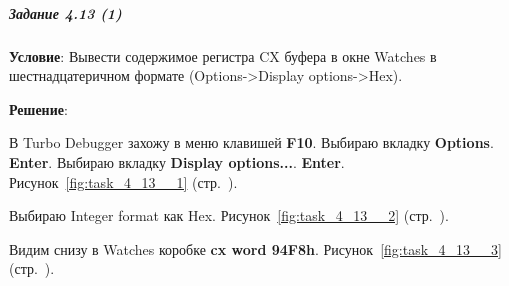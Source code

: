 \subparagraph{Задание 4.13 (1)}

\textbf{Условие}: Вывести содержимое регистра CX буфера в окне Watches в шестнадцатеричном формате (Options->Display options->Hex).

\textbf{Решение}:

В Turbo Debugger захожу в меню клавишей \textbf{F10}. Выбираю вкладку \textbf{Options}. \textbf{Enter}. Выбираю вкладку \textbf{Display options...}. \textbf{Enter}.
Рисунок~\ref{fig:task_4_13__1} (стр.~\pageref{fig:task_4_13__1}).

Выбираю Integer format как Hex.
Рисунок~\ref{fig:task_4_13__2} (стр.~\pageref{fig:task_4_13__2}).

Видим снизу в Watches коробке \textbf{cx word 94F8h}.
Рисунок~\ref{fig:task_4_13__3} (стр.~\pageref{fig:task_4_13__3}).

